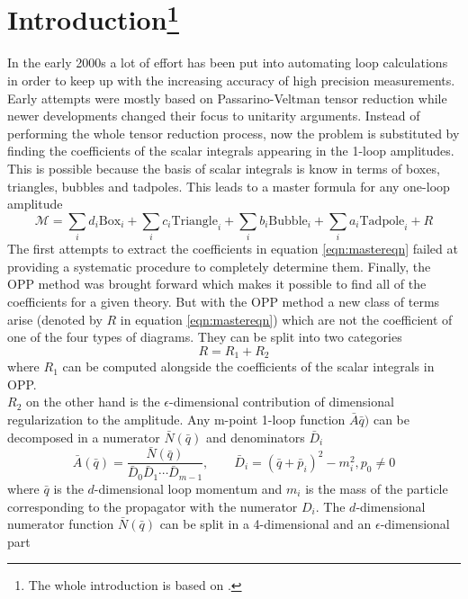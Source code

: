 \section{Introduction\footnote{The whole introduction is based on \cite{R2QCD,R2QED}.}}
\label{sec:Introduction} 
In the early 2000s a lot of effort has been put into automating loop calculations in order to keep up with the increasing accuracy of high precision measurements. Early attempts were mostly based on Passarino-Veltman tensor reduction while newer developments changed their focus to unitarity arguments. Instead of performing the whole tensor reduction process, now the problem is substituted by finding the coefficients of the scalar integrals appearing in the 1-loop amplitudes. This is possible because the basis of scalar integrals is know in terms of boxes, triangles, bubbles and tadpoles. This leads to a master formula for any one-loop amplitude 
\begin{equation}
\label{eqn:mastereqn}
\mathcal{M} = \sum_i d_i \mathrm{Box}_i + \sum_i c_i \mathrm{Triangle}_i + \sum_i b_i \mathrm{Bubble}_i + \sum_i a_i \mathrm{Tadpole}_i + R
\end{equation}
The first attempts to extract the coefficients in equation \ref{eqn:mastereqn} failed at providing a systematic procedure to completely determine them. Finally, the OPP method was brought forward which makes it possible to find all of the coefficients for a given theory. But with the OPP method a new class of terms arise (denoted by $R$ in equation \ref{eqn:mastereqn}) which are not the coefficient of one of the four types of diagrams. They can be split into two categories
\begin{equation}
R = R_1 + R_2
\end{equation}
where $R_1$ can be computed alongside the coefficients of the scalar integrals in OPP. \\
$R_2$ on the other hand is the $\epsilon$-dimensional contribution of dimensional regularization to the amplitude. Any m-point 1-loop function $\bar{A}\bar{q})$ can be decomposed in a numerator $\bar{N}( \bar{q})$ and denominators $\bar{D}_i$
\begin{equation}
\label{eqn:amp}
\bar{A} (\bar{q}) = \frac{\bar{N}(\bar{q})}{\bar{D}_0\bar{D}_1\cdots\bar{D}_{m-1}}, \qquad \bar{D}_i = \left( \bar{q} + \bar{p}_i \right)^2 - m_i^2, p_0 \neq 0
\end{equation}
where $\bar{q}$ is the $d$-dimensional loop momentum and $m_i$ is the mass of the particle corresponding to the propagator with the numerator $D_i$. The $d$-dimensional numerator function $\bar{N}(\bar{q})$ can be split in a 4-dimensional and an $\epsilon$-dimensional part 
